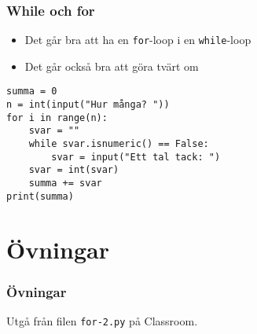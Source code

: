 \documentclass[aspectratio=169]{beamer}
\newcommand{\code}[1]{\colorbox{white}{\lstinline{#1}}}
\begin{document}
\begin{frame}[fragile]
	\frametitle{While och for}
	
	\begin{itemize}
		\item Det går bra att ha en \code{for}-loop i en \code{while}-loop
		\item Det går också bra att göra tvärt om
	\end{itemize}
	
	\begin{lstlisting}
summa = 0
n = int(input("Hur många? "))
for i in range(n):
    svar = ""
    while svar.isnumeric() == False:
        svar = input("Ett tal tack: ")
    svar = int(svar)
    summa += svar
print(summa)
	\end{lstlisting}
	
\end{frame}


\section{Övningar}

\begin{frame}
	\frametitle{Övningar}
	
	Utgå från filen \texttt{for-2.py} på Classroom.

\end{frame}
\end{document}

